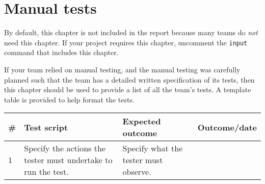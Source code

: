 \chapter{Manual tests}
\label{chap:manual-tests}


\begin{instructions}
By default, this chapter is not included in the report because many teams do \emph{not} need this chapter.  If your project requires this chapter, uncomment the \texttt{input} command that includes this chapter.
\end{instructions}

\begin{expectations}
If your team relied on manual testing, and the manual testing was carefully planned such that the team has a detailed written specification of its tests, then this chapter should be used to provide a list of all the team's tests.  A template table is provided to help format the tests.
\end{expectations}

\begin{longtable}{| p{} | p{} | p{} | p{} |} 
\hline
\# & Test script & Expected outcome & Outcome/date \\ \hline
\endhead
1 & Specify the actions the tester must undertake to run the test. & Specify what the tester must observe. &  \\ \hline
\end{longtable}